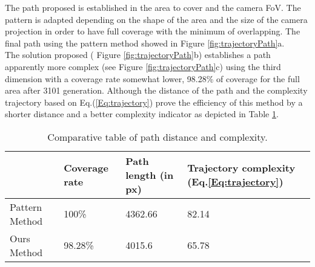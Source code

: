  The path proposed is established in the area to cover and the camera FoV. The pattern is adapted depending on the shape of the area and the size of the camera projection in order to have full coverage with the minimum of overlapping. The final path using the pattern method showed in Figure \ref{fig:trajectoryPath}a.
 \\ The solution proposed ( Figure \ref{fig:trajectoryPath}b) establishes a path apparently more complex (see Figure \ref{fig:trajectoryPath}c) using the third dimension with a coverage rate somewhat lower, 98.28\% of coverage for the full area after 3101 generation.
 Although the distance of the path and the complexity trajectory based on  Eq.(\ref{Eq:trajectory}) prove the efficiency of this method by a shorter distance and a better complexity indicator as depicted in Table \ref{table:trajectory}.\\ 
 \begin{table}[t]
\begin{tabular}{|p{1.5cm}|p{1.8cm}|p{1.8cm}|p{1.8cm}|}
  \hline
   &Coverage rate & Path length (in px) & Trajectory complexity (Eq.\ref{Eq:trajectory})  \\  \hline
  Pattern Method &  100\% & 4362.66 &82.14 \\ \hline
  Ours Method &  98.28\% & 4015.6 &65.78 \\ \hline
\end{tabular}
\caption{Comparative table  of path distance and complexity.}\label{table:trajectory}
\end{table}





